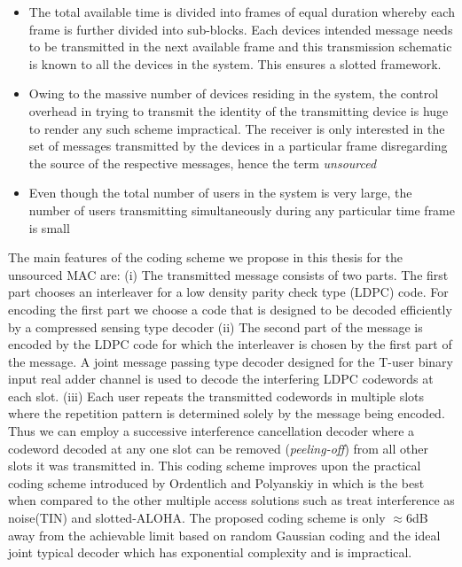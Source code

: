 \begin{itemize}
\item The total available time is divided into frames of equal duration whereby each frame is further divided into sub-blocks. Each devices intended message needs to be transmitted in the next available frame and this transmission schematic is known to all the devices in the system. This ensures a slotted framework.
\item Owing to the massive number of devices residing in the system, the control overhead in trying to transmit the identity of the transmitting device is huge to render any such scheme impractical. The receiver is only interested in the set of messages transmitted by the devices in a particular frame disregarding the source of the respective messages, hence the term \textit{unsourced}
\item Even though the total number of users in the system is very large, the number of users transmitting simultaneously during any particular time frame is small
\end{itemize} 
The main features of the coding scheme we propose in this thesis for the unsourced MAC are: (i) The transmitted message consists of two parts. The first part chooses an interleaver for a low density parity check type (LDPC) code. For encoding the first part we choose a code that is designed to be decoded efficiently by a compressed sensing type decoder (ii) The second part of the message is encoded by the LDPC code for which the interleaver is chosen by the first part of the message. A joint message passing type decoder designed for the T-user binary input real adder channel is used to decode the interfering LDPC codewords at each slot. (iii) Each user repeats the transmitted  codewords in multiple slots where the repetition pattern is determined solely by the message being encoded. Thus we can employ a successive interference cancellation decoder where a codeword decoded at any one slot can be removed  (\textit{peeling-off}) from all other slots it was transmitted in. This coding scheme improves upon the practical coding scheme introduced by Ordentlich and Polyanskiy in \cite{ordentlichlow} which is the best when compared to the other multiple access solutions such as treat interference as noise(TIN) and slotted-ALOHA. The proposed coding scheme is only $\approx 6$dB away from the achievable limit based on random Gaussian coding and the ideal joint typical decoder which has exponential complexity and is impractical.
\fi


